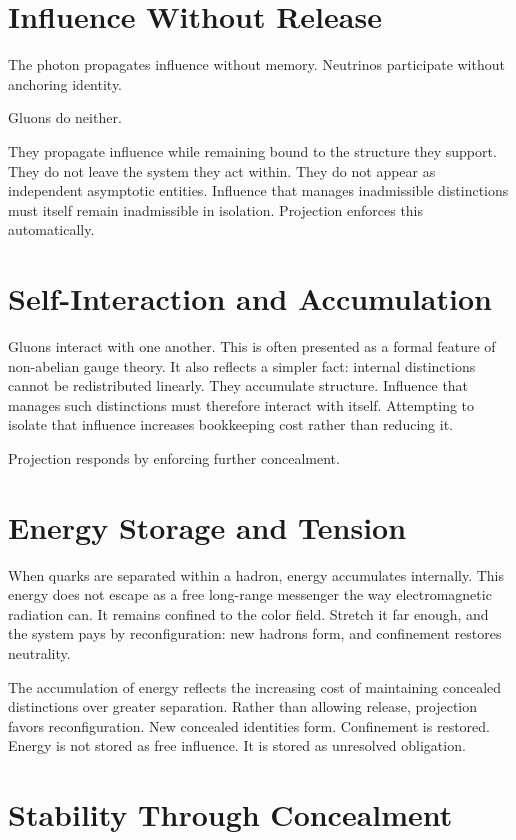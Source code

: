 \documentclass[11pt,twoside,openright]{book}
\begin{document}
\section*{Influence Without Release}

The photon propagates influence without memory. Neutrinos participate without anchoring identity.

Gluons do neither.

They propagate influence while remaining bound to the structure they support. They do not leave the system they act within. They do not appear as independent asymptotic entities. Influence that manages inadmissible distinctions must itself remain inadmissible in isolation. Projection enforces this automatically.

\section*{Self-Interaction and Accumulation}

Gluons interact with one another. This is often presented as a formal feature of non-abelian gauge theory. It also reflects a simpler fact: internal distinctions cannot be redistributed linearly. They accumulate structure. Influence that manages such distinctions must therefore interact with itself. Attempting to isolate that influence increases bookkeeping cost rather than reducing it.

Projection responds by enforcing further concealment.

\section*{Energy Storage and Tension}

When quarks are separated within a hadron, energy accumulates internally. This energy does not escape as a free long-range messenger the way electromagnetic radiation can. It remains confined to the color field. Stretch it far enough, and the system pays by reconfiguration: new hadrons form, and confinement restores neutrality.

The accumulation of energy reflects the increasing cost of maintaining concealed distinctions over greater separation. Rather than allowing release, projection favors reconfiguration. New concealed identities form. Confinement is restored. Energy is not stored as free influence. It is stored as unresolved obligation.

\section*{Stability Through Concealment}
\end{document}
